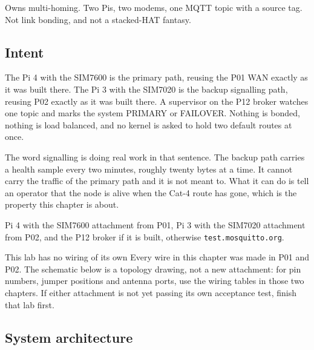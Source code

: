 
\begin{unique}
Owns multi-homing. Two Pis, two modems, one MQTT topic with a source tag. Not link bonding, and not a stacked-HAT fantasy.
\end{unique}

\subsection*{Intent}

The Pi 4 with the SIM7600 is the primary path, reusing the P01 WAN exactly as it was built there. The Pi 3 with the SIM7020 is the backup signalling path, reusing P02 exactly as it was built there. A supervisor on the P12 broker watches one topic and marks the system PRIMARY or FAILOVER. Nothing is bonded, nothing is load balanced, and no kernel is asked to hold two default routes at once.

The word signalling is doing real work in that sentence. The backup path carries a health sample every two minutes, roughly twenty bytes at a time. It cannot carry the traffic of the primary path and it is not meant to. What it can do is tell an operator that the node is alive when the Cat-4 route has gone, which is the property this chapter is about.

\begin{kit}
Pi 4 with the SIM7600 attachment from P01, Pi 3 with the SIM7020 attachment from P02, and the P12 broker if it is built, otherwise \texttt{test.mosquitto.org}.
\end{kit}

\begin{note}{This lab has no wiring of its own}
Every wire in this chapter was made in P01 and P02. The schematic below is a topology drawing, not a new attachment: for pin numbers, jumper positions and antenna ports, use the wiring tables in those two chapters. If either attachment is not yet passing its own acceptance test, finish that lab first.
\end{note}

\subsection*{System architecture}


